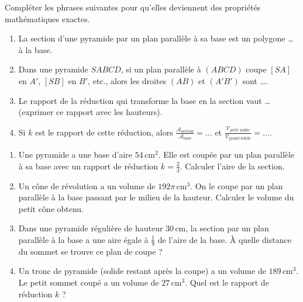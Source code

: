 \documentclass[11pt]{article}
\newcounter{popsec}
\newcounter{popsub}
\newcommand{\courssub}[1]{%
  \stepcounter{popsub}%
  \par\vspace{9pt}\noindent{\popxbold\fontsize{11.5}{13}\selectfont\color{popink}{\color{poporange}\thepopsec.\thepopsub}\hspace{6pt}#1}\par\nopagebreak\vspace{4pt}
}
\begin{document}
\begin{exercice}
Compléter les phrases suivantes pour qu'elles deviennent des propriétés mathématiques exactes.
\begin{enumerate}
    \item La section d'une pyramide par un plan parallèle à sa base est un polygone \emph{\dots} à la base.
    \item Dans une pyramide $SABCD$, si un plan parallèle à $(ABCD)$ coupe $[SA]$ en $A'$, $[SB]$ en $B'$, etc., alors les droites $(AB)$ et $(A'B')$ sont \emph{\dots}.
    \item Le rapport de la réduction qui transforme la base en la section vaut \emph{\dots} (exprimer ce rapport avec les hauteurs).
    \item Si $k$ est le rapport de cette réduction, alors $\frac{\mathcal{A}_{\text{section}}}{\mathcal{A}_{\text{base}}} = \dots$ et $\frac{\mathcal{V}_{\text{petit solide}}}{\mathcal{V}_{\text{grand solide}}} = \dots$.
\end{enumerate}
\end{exercice}

\begin{exercice}
\begin{enumerate}
    \item Une pyramide a une base d'aire $54\,\text{cm}^2$. Elle est coupée par un plan parallèle à sa base avec un rapport de réduction $k = \frac{2}{3}$. Calculer l'aire de la section.
    \item Un cône de révolution a un volume de $192\pi\,\text{cm}^3$. On le coupe par un plan parallèle à la base passant par le milieu de la hauteur. Calculer le volume du petit cône obtenu.
    \item Dans une pyramide régulière de hauteur $30\,\text{cm}$, la section par un plan parallèle à la base a une aire égale à $\frac{1}{9}$ de l'aire de la base. À quelle distance du sommet se trouve ce plan de coupe ?
    \item Un tronc de pyramide (solide restant après la coupe) a un volume de $189\,\text{cm}^3$. Le petit sommet coupé a un volume de $27\,\text{cm}^3$. Quel est le rapport de réduction $k$ ?
\end{enumerate}
\end{exercice}

\courssub{Je m'entraîne}
\end{document}
